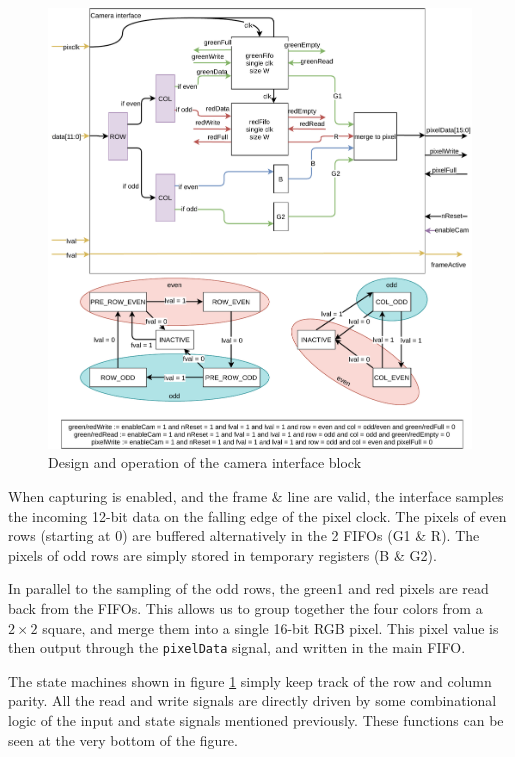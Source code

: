 \documentclass[12pt,a4paper]{article}
\begin{document}
\begin{figure}[ht!]
	\centering
	\includegraphics[width=\textwidth]{figures/camera}
	\caption{Design and operation of the camera interface block}
	\label{fig:camera}
\end{figure}

When capturing is enabled, and the frame \& line are valid, the interface samples the incoming 12-bit data on the falling edge of the pixel clock. The pixels of even rows (starting at 0) are buffered alternatively in the 2 FIFOs (G1 \& R). The pixels of odd rows are simply stored in temporary registers (B \& G2).

In parallel to the sampling of the odd rows, the green1 and red pixels are read back from the FIFOs. This allows us to group together the four colors from a $2\times 2$ square, and merge them into a single 16-bit RGB pixel. This pixel value is then output through the \texttt{pixelData} signal, and written in the main FIFO.

The state machines shown in figure \ref{fig:camera} simply keep track of the row and column parity. All the read and write signals are directly driven by some combinational logic of the input and state signals mentioned previously. These functions can be seen at the very bottom of the figure.
\end{document}
